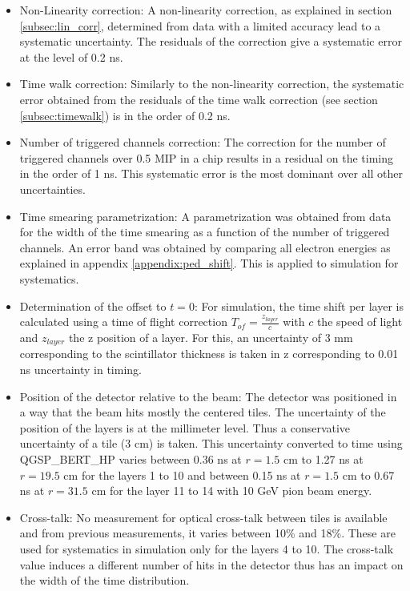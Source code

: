 \begin{itemize}
	\item Non-Linearity correction: A non-linearity correction, as explained in section \ref{subsec:lin_corr}, determined from data with a limited accuracy lead to a systematic uncertainty. The residuals of the correction give a systematic error at the level of 0.2 ns.
	\item Time walk correction: Similarly to the non-linearity correction, the systematic error obtained from the residuals of the time walk correction (see section \ref{subsec:timewalk}) is in the order of 0.2 ns.
	\item Number of triggered channels correction: The correction for the number of triggered channels over 0.5 MIP in a chip results in a residual on the timing in the order of 1 ns. This systematic error is the most dominant over all other uncertainties.
	\item Time smearing parametrization: A parametrization was obtained from data for the width of the time smearing as a function of the number of triggered channels. An error band was obtained by comparing all electron energies as explained in appendix \ref{appendix:ped_shift}. This is applied to simulation for systematics.
	\item Determination of the offset to $t=0$: For simulation, the time shift per layer is calculated using a time of flight correction $T_{of} = \frac{z_{layer}}{c}$ with $c$ the speed of light and $z_{layer}$ the z position of a layer. For this, an uncertainty of 3 mm corresponding to the scintillator thickness is taken in z corresponding to 0.01 ns uncertainty in timing.
	\item Position of the detector relative to the beam: The detector was positioned in a way that the beam hits mostly the centered tiles. The uncertainty of the position of the layers is at the millimeter level. Thus a conservative uncertainty of a tile (3 cm) is taken. This uncertainty converted to time using QGSP\_BERT\_HP varies between 0.36 ns at $r = 1.5$ cm to 1.27 ns at $r = 19.5$ cm for the layers 1 to 10 and between 0.15 ns at $r = 1.5$ cm to 0.67 ns at $r = 31.5$ cm for the layer 11 to 14 with 10 GeV pion beam energy.
	\item Cross-talk: No measurement for optical cross-talk between tiles is available and from previous measurements, it varies between 10\% and 18\%. These are used for systematics in simulation only for the layers 4 to 10. The cross-talk value induces a different number of hits in the detector thus has an impact on the width of the time distribution.

\end{itemize}
